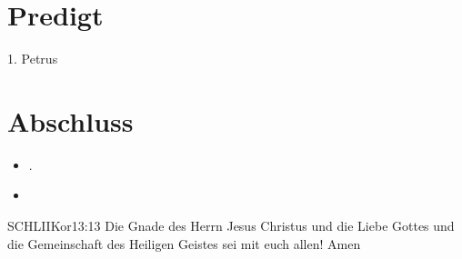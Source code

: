 \documentclass[fontsize=14pt]{mybib}
\begin{document}
\section{Predigt}
    1. Petrus
\section{Abschluss}
\begin{itemize}
    \item {}.
    \item {}
\end{itemize}
\begin{bibelbox}{SCHL}{IIKor}{13:13}
    Die Gnade des Herrn Jesus Christus und die Liebe Gottes und die Gemeinschaft des Heiligen Geistes sei mit euch allen! Amen
\end{bibelbox}
\end{document}
